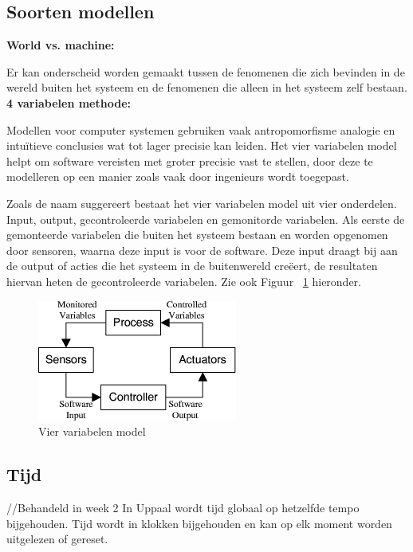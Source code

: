 \documentclass{article}
\begin{document}
\subsection{Soorten modellen} \label{SoortenModellen}

\textbf{World vs. machine:} 

Er kan onderscheid worden gemaakt tussen de fenomenen die zich bevinden in de wereld buiten het systeem en de fenomenen die alleen in het systeem zelf bestaan. \newline
\textbf{4 variabelen methode:}

Modellen voor computer systemen gebruiken vaak antropomorfisme analogie en intuïtieve conclusies wat tot lager precisie kan leiden. Het vier variabelen model helpt om software vereisten met groter precisie vast te stellen, door deze te modelleren op een manier zoals vaak door ingenieurs wordt toegepast. \cite{parnas1995functional} 

Zoals de naam suggereert bestaat het vier variabelen model uit vier onderdelen. Input, output, gecontroleerde variabelen en gemonitorde variabelen. Als eerste de gemonteerde variabelen die buiten het systeem bestaan en worden opgenomen door sensoren, waarna deze input is voor de software. Deze input draagt bij aan de output of acties die het systeem in de buitenwereld creëert, de resultaten hiervan heten de gecontroleerde variabelen. Zie ook Figuur ~\ref{fig:four_Variables} hieronder.


\begin{figure}[!h]
	\centering
	\includegraphics[width=\textwidth]{four_Variables}
    \caption{Vier variabelen model \cite{thompson2000requirements}}
	\label{fig:four_Variables}
\end{figure}

\subsection{Tijd}
//Behandeld in week 2 \newline
In Uppaal wordt tijd globaal op hetzelfde tempo bijgehouden. Tijd wordt in klokken bijgehouden en kan op elk moment worden uitgelezen of gereset. \cite{uppaalsmalltutorial}
\end{document}
